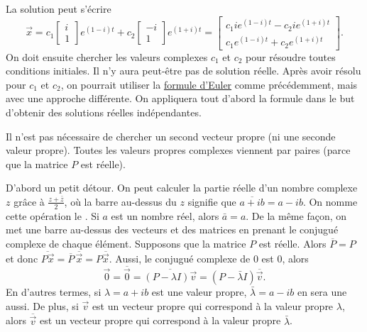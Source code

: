 La solution peut s’écrire
\begin{equation*}
\vec{x} =
c_1 \begin{bmatrix} i \\ 1 \end{bmatrix} e^{(1-i)t} +
c_2 \begin{bmatrix} -i \\ 1 \end{bmatrix} e^{(1+i)t}
=
\begin{bmatrix}
c_1 i e^{(1-i)t} - c_2 i e^{(1+i)t} \\
c_1 e^{(1-i)t} + c_2 e^{(1+i)t}
\end{bmatrix} .
\end{equation*}
On doit ensuite chercher les valeurs complexes $c_1$ et $c_2$ pour résoudre toutes conditions initiales. Il n’y aura peut-être pas de solution réelle. Après avoir résolu pour $c_1$ et $c_2$,
on pourrait utiliser la 
\hyperref[eulersformula]{formule d'Euler} comme précédemment, mais avec une approche différente. On appliquera tout d’abord la formule dans le but d’obtenir des solutions réelles indépendantes.

\medskip

Il n’est pas nécessaire de chercher un second vecteur propre (ni une seconde valeur propre). Toutes les valeurs propres complexes viennent par paires (parce que la matrice $P$ est réelle).

D’abord un petit détour. On peut calculer la partie réelle d’un nombre complexe $z$ grâce à $\frac{z + \bar{z}}{2}$, où la barre au-dessus du $z$ signifie que $\overline{a+ib} = a -ib$.  On nomme cette opération le \emph{}. Si
$a$ est un nombre réel, alors $\bar{a} = a$.
De la même façon, on met une barre au-dessus des vecteurs et des matrices en prenant le conjugué complexe de chaque élément. Supposons que la matrice $P$ est réelle. Alors
$\overline{P} = P$ et donc $\overline{P\vec{x}} = \overline{P} \,
\overline{\vec{x}} = P \overline{\vec{x}}$.
Aussi, le conjugué complexe de 0 est 0, alors
\begin{equation*}
\vec{0} = \overline{\vec{0}} = 
\overline{(P-\lambda I)\vec{v}}
=
(P-\bar{\lambda} I)\overline{\vec{v}} .
\end{equation*}
En d’autres termes, si $\lambda = a+ib$ est une valeur propre, $\bar{\lambda} = a-ib$ en sera une aussi. De plus, si
$\vec{v}$ est un vecteur propre qui correspond à la valeur propre
$\lambda$, alors $\overline{\vec{v}}$ est un vecteur propre qui correspond à la valeur propre $\bar{\lambda}$.  

